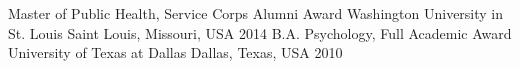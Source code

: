 \begin{cveds}

 \cved
    {Master of Public Health, Service Corps Alumni Award}
    {Washington University in St. Louis}
    {Saint Louis, Missouri, USA}
    {2014}
    \cved
  {B.A. Psychology, Full Academic Award}
  {University of Texas at Dallas}
{Dallas, Texas, USA}
{2010}
\end{cveds}
